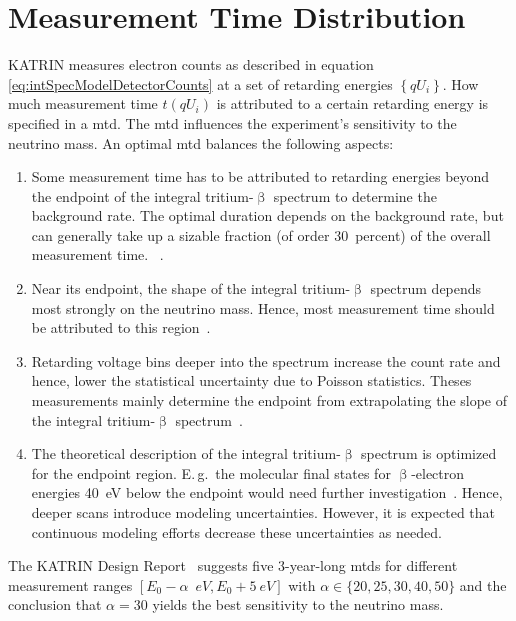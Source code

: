 \section{Measurement Time Distribution}
\label{sec:intSpecModelMTD}
KATRIN measures electron counts as described in equation \eqref{eq:intSpecModelDetectorCounts} at a set of retarding energies $\left\{qU_i\right\}$. How much measurement time $t(qU_i)$ is attributed to a certain retarding energy is specified in a \gls{mtd}. The \gls{mtd} influences the experiment's sensitivity to the neutrino mass. An optimal \gls{mtd} balances the following aspects:
\begin{enumerate}
	\item Some measurement time has to be attributed to retarding energies beyond the endpoint of the integral tritium-$\upbeta$ spectrum to determine the background rate. The optimal duration depends on the background rate, but can generally take up a sizable fraction (of order \SI{30}{percent}) of the overall measurement time. ~\cite{Angrik:2005ep, Kleesiek2014}.
	\item Near its endpoint, the shape of the integral tritium-$\upbeta$ spectrum depends most strongly on the neutrino mass. Hence, most measurement time should be attributed to this region~\cite{Angrik:2005ep, Kleesiek2014}.
	\item Retarding voltage bins deeper into the spectrum increase the count rate and hence, lower the statistical uncertainty due to Poisson statistics. Theses measurements mainly determine the endpoint from extrapolating the slope of the integral tritium-$\upbeta$ spectrum~\cite{Angrik:2005ep, Kleesiek2014}.
	\item The theoretical description of the integral tritium-$\upbeta$ spectrum is optimized for the endpoint region. E.\,g.~the molecular final states for $\upbeta$-electron energies \SI{40}{eV} below the endpoint would need further investigation~\cite{Doss:2006}. Hence, deeper scans introduce modeling uncertainties. However, it is expected that continuous modeling efforts decrease these uncertainties as needed.
\end{enumerate}
The KATRIN Design Report~\cite{Angrik:2005ep} suggests five \mbox{3-year-long} \gls{mtd}s for different measurement ranges $[E_0-\alpha\;\SI{}{eV}, E_0 + \SI{5}{eV}]$ with $\alpha \in \{20, 25, 30, 40, 50\}$ and the conclusion that $\alpha=30$ yields the best sensitivity to the neutrino mass.

